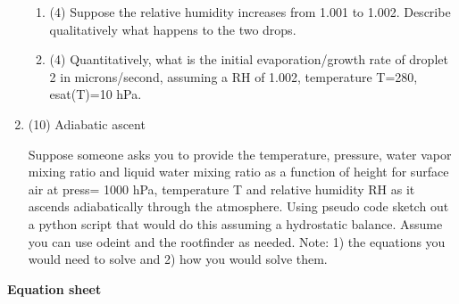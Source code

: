 \documentclass[12pt]{article}
\begin{document}
\begin{enumerate}
\begin{enumerate}
\item (4) Suppose the relative humidity increases from 1.001 to 1.002.  Describe
qualitatively what happens to the two drops.



\item (4) Quantitatively, what is the initial evaporation/growth rate of droplet
2 in microns/second, assuming a RH of 1.002, temperature T=280, esat(T)=10 hPa.

\end{enumerate}


\item (10) Adiabatic ascent

  Suppose someone asks you to provide the temperature, pressure, water vapor mixing ratio and liquid water mixing ratio as a function of height for surface air at press= 1000 hPa, temperature T and relative humidity RH as it ascends adiabatically through the atmosphere.  Using pseudo code sketch out a python script that would do this assuming a hydrostatic balance.  Assume you can use odeint and the rootfinder as needed.   Note:  1) the equations you would need to solve and 2) how you would solve them.


\end{enumerate}

\newpage

\begin{center}
  \textbf{Equation sheet}
\end{center}
\end{document}
